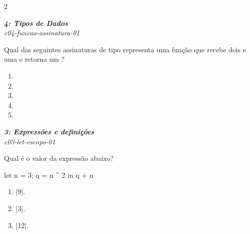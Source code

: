 \documentclass[a4paper,10pt,brazil]{article}
\begin{document}
\begin{multicols}{2}
\begin{flushright}
  \footnotesize
  \textit{\textbf{4: Tipos de Dados}}\\
  \textit{c04-funcao-assinatura-01}\\

\end{flushright}
Qual das seguintes assinaturas de tipo representa uma função que recebe dois  e uma  e retorna um ?

\begin{enumerate}
  \item {}

  \item {}

  \item {}

  \item {}

  \item {}


\end{enumerate}

\begin{flushright}
  \footnotesize
  \textit{\textbf{3: Expressões e definições}}\\
  \textit{c03-let-escopo-01}\\

\end{flushright}
Qual é o valor da expressão abaixo?

\begin{haskellcode}
let n = 3; q = n ^ 2 in q + n
\end{haskellcode}

\begin{enumerate}
  \item \haskellinline|9|.

  \item \haskellinline|3|.

  \item \haskellinline|12|.


\end{enumerate}
\end{multicols}
\end{document}
